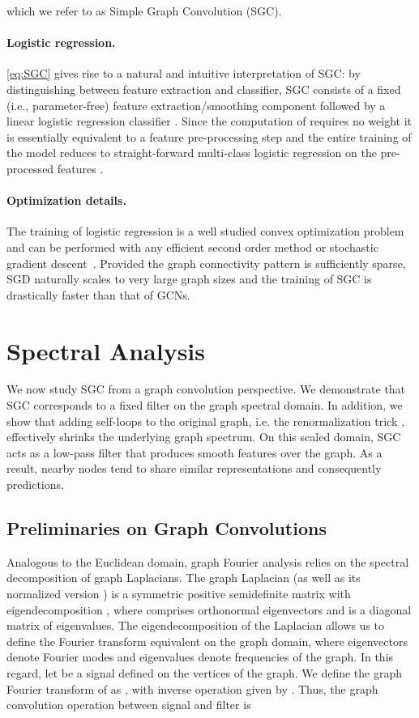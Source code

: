 \documentclass{article}
\newcommand{\Method}{Simple Graph Convolution}
\newcommand{\method}{SGC}
\begin{document}
which we refer to as \Method{} (\method{}). 

\paragraph{Logistic regression.} \autoref{eq:SGC} gives rise to a  natural and intuitive interpretation of \method{}: by distinguishing between feature extraction and classifier, \method{} consists of a fixed (i.e., parameter-free) feature extraction/smoothing component  followed by a linear logistic regression classifier . Since the computation of  requires no weight it is essentially equivalent to a feature pre-processing step and the entire training of the model reduces to straight-forward multi-class logistic regression on the pre-processed features .


\paragraph{Optimization details.} The training of logistic regression is a well studied convex optimization problem and can be performed with any efficient second order method or stochastic gradient descent~\cite{bottou2010large}. Provided the graph connectivity pattern  is sufficiently sparse, SGD naturally scales to very large graph sizes and the training of \method{} is  drastically faster than that of GCNs.   

 
\section{Spectral Analysis}
\label{sec:analysis}
We now study \method{} from a graph convolution perspective. We demonstrate that \method{} corresponds to a fixed filter on the graph spectral domain. 
In addition, we show that adding self-loops to the original graph, i.e. the renormalization trick \citep{gcn}, effectively shrinks the underlying graph spectrum.
On this scaled domain, \method{} acts as a low-pass filter that produces smooth features over the graph. As a result, nearby nodes tend to share similar representations and consequently predictions.


\subsection{Preliminaries on Graph Convolutions}
Analogous to the Euclidean domain, graph Fourier analysis relies on the spectral decomposition of graph Laplacians. The graph Laplacian  (as well as its normalized version ) is a symmetric positive semidefinite matrix with eigendecomposition , where  comprises orthonormal eigenvectors and  is a diagonal matrix of eigenvalues. The eigendecomposition of the Laplacian allows us to define the Fourier transform equivalent on the graph domain, where eigenvectors denote Fourier modes and eigenvalues denote frequencies of the graph. In this regard, let  be a signal defined on the vertices of the graph. We define the graph Fourier transform of  as , with inverse operation given by .
Thus, the graph convolution operation between signal  and filter  is
\end{document}
